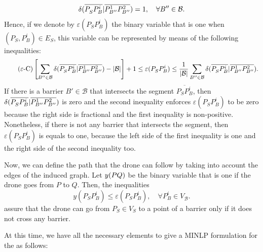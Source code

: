 \documentclass[a4paper]{elsarticle}
\newcommand{\SPP}{{\sf{SPPN-P} \xspace}}
\newcommand{\B}{{\mathcal B}}
\newcommand{\VB}{{V^{}_{\mathcal B}}}
\newcommand{\VS}{{V^{}_{S}}}
\newcommand{\ES}{{E^{}_{S}}}
\newcommand{\VT}{{V^{}_{T}}}
\begin{document}
\newcommand{\varepsilonvar}[2]{\varepsilon(#1#2)}
$$\deltacheck{P^{}_S}{P_B^i}{P^1_{B''}}{P^2_{B''}}=1,\quad\forall B''\in\B.$$
Hence, if we denote by $\varepsilonvar{P^{}_S}{P_B^i}$ the binary variable that is one when $(P^{}_S,P_B^i)\in\ES$, this variable can be represented by means of the following inequalities:
\begin{equation*}\tag{$\varepsilon$-C}\label{eq:varepsilonC}
\left[\sum_{B''\in\mathcal B}\deltacheck{P^{}_S}{P_B^i}{P^1_{B''}}{P^2_{B''}}-|\mathcal B|\right] + 1\leq \varepsilonvar{P^{}_S}{P_B^i}\leq \frac{1}{|\B|}\sum_{B''\in\mathcal B}\deltacheck{P^{}_S}{P_B^i}{P^1_{B''}}{P^2_{B''}}.
\end{equation*}
If there is a barrier $B'\in\B$ that intersects the segment $\overline{P^{}_SP_B^i}$, then $\delta(\overline{P^{}_SP_B^i}|\overline{P^1_{B''}P^2_{B''}})$ is zero and the second inequality enforces $\varepsilonvar{P^{}_S}{P_B^i}$ to be zero because the right side is fractional and the first inequality is non-positive. Nonetheless, if there is not any barrier that intersects the segment, then $\varepsilonvar{P^{}_S}{P_B^i}$ is equals to one, because the left side of the first inequality is one and the right side of the second inequality too.

\newcommand{\yvar}[2]{y(#1#2)}

Now, we can define the path that the drone can follow by taking into account the edges of the induced graph. Let $\yvar{PQ}$ be the binary variable that is one if the drone goes from $P$ to $Q$. Then, the inequalities
\begin{equation*}\tag{y-C}\label{eq:yC}
\yvar{P^{}_S}{P_B^i}\leq \varepsilonvar{P^{}_S}{P_B^i},\quad\forall P_B^i\in \VB.
\end{equation*}
assure that the drone can go from $P_S^{}\in \VS$ to a point of a barrier only if it does not cross any barrier. 


At this time, we have all the necessary elements to give a MINLP formulation for the \SPP as follows:
\end{document}
